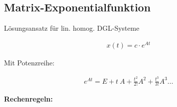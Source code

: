 \documentclass[10pt,a4paper]{article}
\begin{document}
  \subsection{Matrix-Exponentialfunktion}
  Lösungsansatz für lin. homog. DGL-Systeme
  \begin{mdframed}[style=exercise]
    \begin{align}
        x(t) = c \cdot e^{At}
    \end{align}
  \end{mdframed}
  Mit Potenzreihe:
  \begin{mdframed}[style=exercise]
    \begin{align}
        e^{At} = E + t\ A+ \frac{t^2}{2!}A^2+ \frac{t^3}{3!}A^3 ...
    \end{align}
  \end{mdframed}
\textbf{Rechenregeln:}
\end{document}
